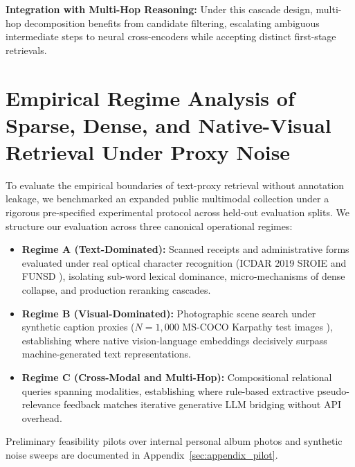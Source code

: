 \documentclass[conference]{IEEEtran}
\begin{document}
\textbf{Integration with Multi-Hop Reasoning:} Under this cascade design, multi-hop decomposition benefits from candidate filtering, escalating ambiguous intermediate steps to neural cross-encoders while accepting distinct first-stage retrievals.


\section{Empirical Regime Analysis of Sparse, Dense, and Native-Visual Retrieval Under Proxy Noise}
\label{sec:regime_analysis}
\label{sec:public_regime_analysis}

To evaluate the empirical boundaries of text-proxy retrieval without annotation leakage, we benchmarked an expanded public multimodal collection under a rigorous pre-specified experimental protocol across held-out evaluation splits. We structure our evaluation across three canonical operational regimes:
\begin{itemize}
    \setlength{\itemsep}{0.2pt plus 0.1pt}
    \setlength{\parskip}{0pt}
    \item \textbf{Regime A (Text-Dominated):} Scanned receipts and administrative forms evaluated under real optical character recognition (ICDAR 2019 SROIE \cite{huang2019sroie} and FUNSD \cite{jaume2019funsd}), isolating sub-word lexical dominance, micro-mechanisms of dense collapse, and production reranking cascades.
    \item \textbf{Regime B (Visual-Dominated):} Photographic scene search under synthetic caption proxies ($N=1{,}000$ MS-COCO Karpathy test images \cite{lin2014coco}), establishing where native vision-language embeddings decisively surpass machine-generated text representations.
    \item \textbf{Regime C (Cross-Modal and Multi-Hop):} Compositional relational queries spanning modalities, establishing where rule-based extractive pseudo-relevance feedback matches iterative generative LLM bridging without API overhead.
\end{itemize}
Preliminary feasibility pilots over internal personal album photos and synthetic noise sweeps are documented in Appendix~\ref{sec:appendix_pilot}.
\end{document}
